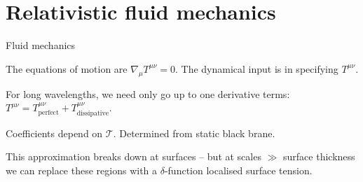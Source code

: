 \documentclass{beamer}
\newcommand{\tc}{\mathcal{T_\mathrm{c}}}
\newcommand{\tloc}{\mathcal{T}}
\newcommand{\ploc}{\mathcal{P}}
\begin{document}

\section{Relativistic fluid mechanics}

%


\begin{frame}{Fluid mechanics}
%

 \vp The equations of motion are $\nabla_\mu T^{\mu\nu}=0$. The dynamical input is in specifying $T^{\mu\nu}$.

 \vp For long wavelengths, we need only go up to one derivative terms: $T^{\mu\nu} = T^{\mu\nu}_\mathrm{perfect} + T^{\mu\nu}_\mathrm{dissipative}$.

 \vp Coefficients depend on $\tloc$. Determined from static black brane.

 \vp This approximation breaks down at surfaces -- but at scales $\gg$ surface thickness we can replace these regions with a $\delta$-function localised surface tension.
%
\end{frame}
\end{document}
